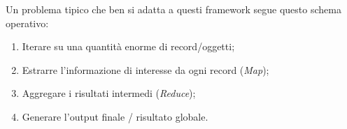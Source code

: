 Un problema tipico che ben si adatta a questi framework segue questo schema operativo:
\begin{enumerate}
    \item Iterare su una quantità enorme di record/oggetti;
    \item Estrarre l'informazione di interesse da ogni record (\textit{Map});
    \item Aggregare i risultati intermedi (\textit{Reduce});
    \item Generare l'output finale / risultato globale.
\end{enumerate}